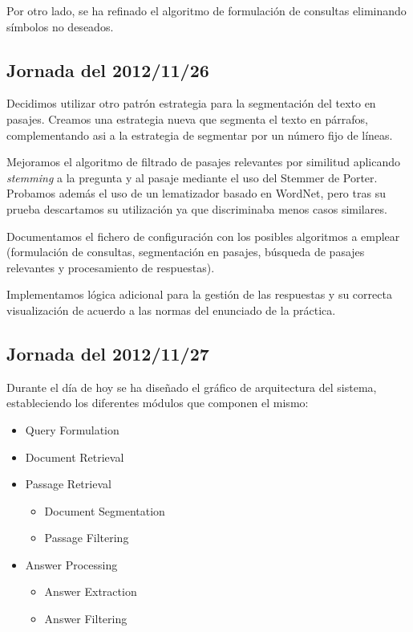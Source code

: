\documentclass[12pt,a4paper,titlepage]{article}
\begin{document}
Por otro lado, se ha refinado el algoritmo de formulación de consultas eliminando símbolos no deseados.

\subsection{Jornada del 2012/11/26}
Decidimos utilizar otro patrón estrategia para la segmentación del texto en pasajes. Creamos una estrategia nueva que segmenta el texto en párrafos, complementando asi a la estrategia de segmentar por un número fijo de líneas.

Mejoramos el algoritmo de filtrado de pasajes relevantes por similitud aplicando \emph{stemming} a la pregunta y al pasaje mediante el uso del Stemmer de Porter. Probamos además el uso de un lematizador basado en WordNet, pero tras su prueba descartamos su utilización ya que discriminaba menos casos similares.

Documentamos el fichero de configuración con los posibles algoritmos a emplear (formulación de consultas, segmentación en pasajes, búsqueda de pasajes relevantes y procesamiento de respuestas).

Implementamos lógica adicional para la gestión de las respuestas y su correcta visualización de acuerdo a las normas del enunciado de la práctica.

\subsection{Jornada del 2012/11/27}
Durante el día de hoy se ha diseñado el gráfico de arquitectura del sistema, estableciendo los diferentes módulos que componen el mismo:

\begin{itemize}
\item Query Formulation
\item Document Retrieval
\item Passage Retrieval
	\begin{itemize}
	\item Document Segmentation
	\item Passage Filtering
	\end{itemize}
\item Answer Processing
	\begin{itemize}
	\item Answer Extraction
	\item Answer Filtering
	\end{itemize}
\end{itemize}
\end{document}
